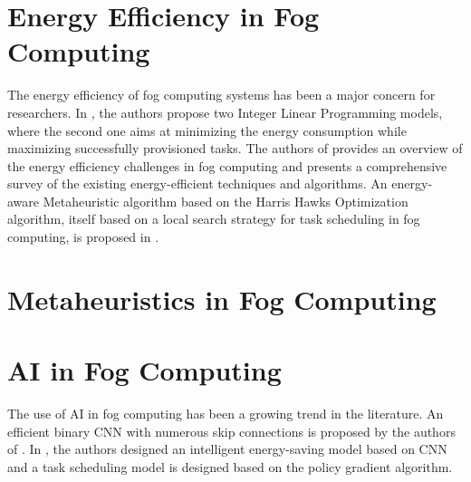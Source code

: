 \section*{Energy Efficiency in Fog Computing}

The energy efficiency of fog computing systems has been a major concern for researchers. In \cite{he_et_al_2020}, the
authors propose two Integer Linear Programming models, where the second one aims at minimizing the energy consumption
while maximizing successfully provisioned tasks. The authors of \cite{malik_et_al_2022} provides an overview of the
energy efficiency challenges in fog computing and presents a comprehensive survey of the existing energy-efficient
techniques and algorithms. An energy-aware Metaheuristic algorithm based on the Harris Hawks Optimization algorithm,
itself based on a local search strategy for task scheduling in fog computing, is proposed in
\cite{abdel-basset_et_al_2021}.

\section*{Metaheuristics in Fog Computing}



\section*{AI in Fog Computing}

The use of AI in fog computing has been a growing trend in the literature. An efficient binary CNN with numerous skip
connections is proposed by the authors of \cite{wu_et_al_2021}. In \cite{yang_et_al_2022}, the authors designed an
intelligent energy-saving model based on CNN and a task scheduling model is designed based on the policy gradient
algorithm.